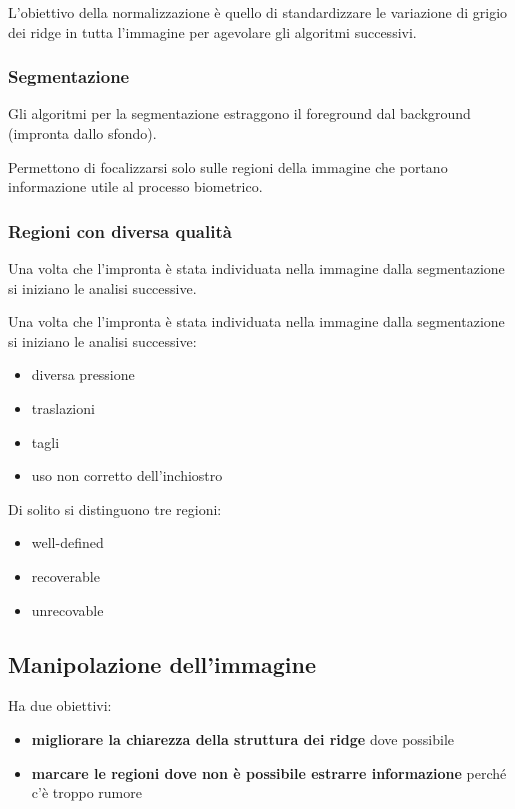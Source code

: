 L’obiettivo della normalizzazione è quello di standardizzare le
variazione di grigio dei ridge in tutta l’immagine per agevolare
gli algoritmi successivi.

\subsubsection{Segmentazione}

Gli algoritmi per la segmentazione estraggono il foreground
dal background (impronta dallo sfondo).

\noindent Permettono di focalizzarsi solo sulle regioni della immagine che 
portano informazione utile al processo biometrico.

\subsubsection{Regioni con diversa qualità}

Una volta che l’impronta è stata individuata nella immagine
dalla segmentazione si iniziano le analisi successive.

\noindent Una volta che l’impronta è stata individuata nella immagine
dalla segmentazione si iniziano le analisi successive:
\begin{itemize}
    \item diversa pressione
    \item traslazioni
    \item tagli
    \item uso non corretto dell'inchiostro
\end{itemize}

Di solito si distinguono tre regioni:
\begin{itemize}
    \item well-defined
    \item recoverable
    \item unrecovable
\end{itemize}

\subsection{Manipolazione dell'immagine}

Ha due obiettivi:
\begin{itemize}
    \item \textbf{migliorare la chiarezza della struttura dei ridge} dove possibile
    \item \textbf{marcare le regioni dove non è possibile estrarre informazione} perché c'è troppo rumore
\end{itemize}

